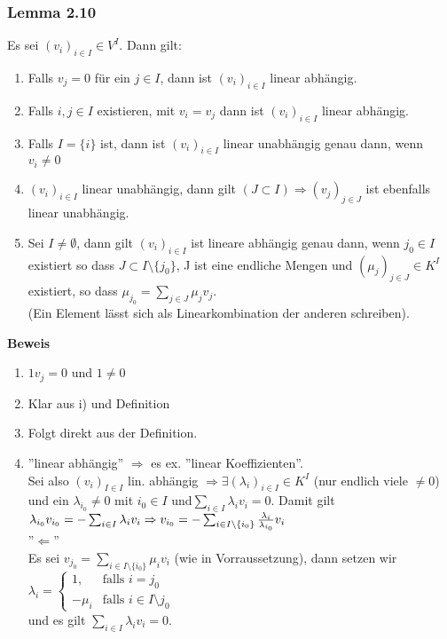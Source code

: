 \documentclass{scrartcl}
\newcommand{\lb}{\lambda}
\begin{document}
\subsubsection{Lemma 2.10}
Es sei \((v_i)_{i \in I} \in V^I\). Dann gilt:
\begin{enumerate}
\item{Falls \(v_j = 0\) f\"ur ein \(j \in I\), dann ist \((v_i)_{i \in I}\) linear abh\"angig.}
\item{Falls \(i, j \in I\) existieren, mit \(v_i = v_j\) dann ist \((v_i)_{i \in I}\) linear abh\"angig.}
\item{Falls \(I = \{i\}\) ist, dann ist \((v_i)_{i \in I}\) linear unabh\"angig genau dann, wenn \(v_i \neq 0\)}
\item{\((v_i)_{i \in I}\) linear unabh\"angig, dann gilt \((J \subset I) \Rightarrow (v_j)_{j \in J}\) ist ebenfalls linear unabh\"angig.}
\item{Sei \(I \neq \emptyset\), dann gilt \((v_i)_{i \in I}\) ist lineare abh\"angig genau dann, wenn \(j_0 \in I\) existiert so dass \(J \subset I \setminus \{j_0\}\), J ist eine endliche Mengen und \((\mu_j)_{j \in J} \in K^I\) existiert, so dass \(\mu_{j_0} = \sum_{j \in J} \mu_j v_j \).\\
(Ein Element l\"asst sich als Linearkombination der anderen schreiben).}
\end{enumerate}
\textbf{Beweis}
\begin{enumerate}
\item{\(1 v_j = 0\) und \(1 \neq 0\)}
\item{Klar aus i) und Definition}
\item{Folgt direkt aus der Definition.}
\item{''linear abh\"angig'' \(\Rightarrow\) es ex. ''linear Koeffizienten''.\\
Sei also \((v_i)_{I \in I}\) lin. abh\"angig \(\Rightarrow \exists (\lb_i)_{i\in I} \in K^I\) (nur endlich viele \(\neq 0\)) und ein \(\lb_{i_0} \neq 0\) mit \(i_0 \in I\) und\(\sum_{i \in I} \lb_i v_i = 0\). Damit gilt \(\lb_{i_0} v_{i_0} = - \sum_{i \in I}\lb_i v_i\\
\Rightarrow v_{i_0} = -\sum_{i \in I \setminus \{i_0\}} \frac{\lb_i}{\lb_{i_0}} v_i\)\\
''\(\Leftarrow\)''\\
Es sei \(v_{j_0} = \sum_{i \in I \setminus \{i_0\}} \mu_i v_i\) (wie in Vorraussetzung), dann setzen wir\\
\(\lb_i = \begin{cases}1, & \text{falls } i = j_0\\-\mu_i & \text{falls } i\in I \setminus j_0\end{cases}\)\\
und es gilt \(\sum_{i \in I} \lb_i v_i = 0\).}
\end{enumerate}
\end{document}
